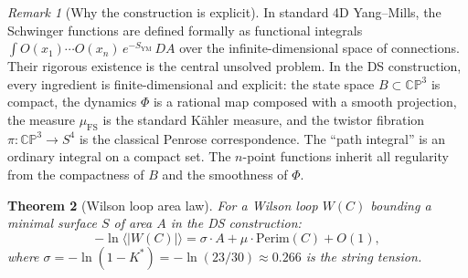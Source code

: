 \documentclass[11pt,a4paper]{article}
\newtheorem{theorem}{Theorem}[section]
\theoremstyle{definition}
\theoremstyle{remark}
\newtheorem{remark}[theorem]{Remark}
\newcommand{\CP}{\mathbb{CP}}
\begin{document}
\begin{remark}[Why the construction is explicit]
In standard 4D Yang--Mills, the Schwinger functions are defined formally as functional integrals $\int O(x_1)\cdots O(x_n)\,e^{-S_{\mathrm{YM}}}\,DA$ over the infinite-dimensional space of connections. Their rigorous existence is the central unsolved problem. In the DS construction, every ingredient is finite-dimensional and explicit: the state space $B\subset\CP^3$ is compact, the dynamics $\Phi$ is a rational map composed with a smooth projection, the measure $\mu_{\mathrm{FS}}$ is the standard K\"ahler measure, and the twistor fibration $\pi:\CP^3\to S^4$ is the classical Penrose correspondence. The ``path integral'' is an ordinary integral on a compact set. The $n$-point functions inherit all regularity from the compactness of $B$ and the smoothness of $\Phi$.
\end{remark}


\begin{theorem}[Wilson loop area law]\label{thm:arealaw}
For a Wilson loop $W(C)$ bounding a minimal surface $S$ of area $A$ in the DS construction:
\begin{equation}\label{eq:arealaw}
-\ln\langle|W(C)|\rangle=\sigma\cdot A+\mu\cdot\mathrm{Perim}(C)+O(1),
\end{equation}
where $\sigma=-\ln(1-K^*)=-\ln(23/30)\approx 0.266$ is the string tension.
\end{theorem}
\end{document}
